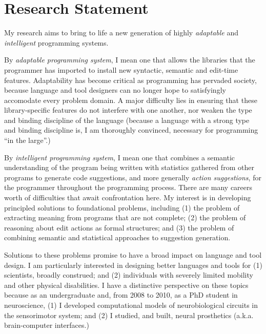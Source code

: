 \documentclass[10pt]{article}
\begin{document}
\section*{Research Statement}
My research aims to bring to life a new generation of highly \emph{adaptable} and \emph{intelligent} programming systems.

By \emph{adaptable programming system}, I mean one that allows the libraries that the programmer has imported to install new syntactic, semantic and edit-time features. Adaptability has become critical as programming has pervaded society, because language and tool designers can no longer hope to satisfyingly accomodate every problem domain. A major difficulty lies in ensuring that these library-specific features do not interfere with one another, nor weaken the type and binding discipline of the language (because a language with a strong type and binding discipline is, I am thoroughly convinced, necessary for programming ``in the large''.)%

By \emph{intelligent programming system}, I mean one that combines a semantic understanding of the program being written with statistics gathered from other programs to generate code suggestions, and more generally \emph{action suggestions}, for the programmer throughout the programming process. There are many careers worth of difficulties that await confrontation here. My interest is in developing principled solutions to foundational problems, including (1) the problem of extracting meaning from programs that are not complete; (2) the problem of reasoning about edit actions as formal structures; and (3) the problem of combining semantic and statistical approaches to suggestion generation.

Solutions to these problems promise to have a broad impact on language and tool design. I am particularly interested in designing better languages and tools for (1) scientists, broadly construed; and (2) individuals with severely limited mobility and other physical disabilities. I have a distinctive perspective on these topics because as an undergraduate and, from 2008 to 2010, as a PhD student in neuroscience, (1) I developed computational models of neurobiological circuits in the sensorimotor system; and (2) I studied, and built, neural prosthetics (a.k.a. brain-computer interfaces.)
\end{document}
